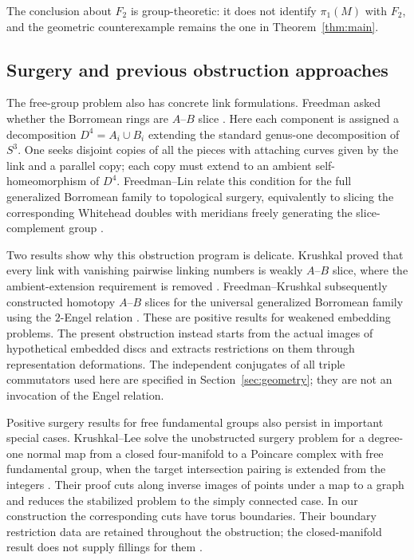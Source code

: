 The conclusion about $F_2$ is group-theoretic: it does not identify
$\pi_1(M)$ with $F_2$, and the geometric counterexample remains the
one in Theorem~\ref{thm:main}.

\subsection{Surgery and previous obstruction approaches}

The free-group problem also has concrete link formulations. Freedman
asked whether the Borromean rings are $A$--$B$ slice
\cite{Freedman1986AB}. Here each component is assigned a decomposition
$D^4=A_i\cup B_i$ extending the standard genus-one decomposition of
$S^3$. One seeks disjoint copies of all the pieces with attaching
curves given by the link and a parallel copy; each copy must extend
to an ambient self-homeomorphism of $D^4$. Freedman--Lin relate this
condition for the full generalized Borromean family to topological
surgery, equivalently to slicing the corresponding Whitehead doubles
with meridians freely generating the slice-complement group
\cite[pp.~91--92]{FL1989}.

Two results show why this obstruction program is delicate. Krushkal
proved that every link with vanishing pairwise linking numbers is
weakly $A$--$B$ slice, where the ambient-extension requirement is
removed \cite[Theorem~1 and Definition~2.4]{Krushkal2008}.
Freedman--Krushkal subsequently constructed homotopy $A$--$B$ slices
for the universal generalized Borromean family using the $2$-Engel
relation \cite[Theorem~1 and Definition~3.10]{FK2016}.
These are positive results for weakened embedding problems. The
present obstruction instead starts from the actual images of
hypothetical embedded discs and extracts restrictions on them through
representation deformations. The independent conjugates of all triple
commutators used here are specified in Section~\ref{sec:geometry};
they are not an invocation of the Engel relation.

Positive surgery results for free fundamental groups also persist in
important special cases. Krushkal--Lee solve the unobstructed surgery
problem for a degree-one normal map from a closed four-manifold to a
Poincare complex with free fundamental group, when the target
intersection pairing is extended from the integers
\cite[Theorem~1]{KL2002}. Their proof cuts along inverse images of
points under a map to a graph and reduces the stabilized problem to
the simply connected case. In our construction the corresponding
cuts have torus boundaries. Their boundary restriction data are
retained throughout the obstruction; the closed-manifold result does
not supply fillings for them \cite[Introduction, Remark]{KL2002}.

